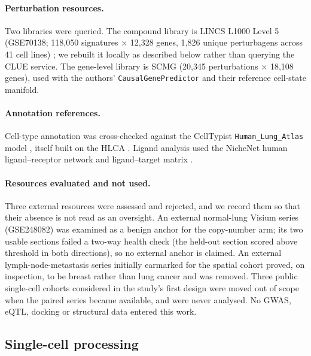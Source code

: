 \paragraph{Perturbation resources.} Two libraries were queried. The compound library is
LINCS L1000 Level 5 (GSE70138; 118{,}050 signatures $\times$ 12{,}328 genes, 1{,}826
unique perturbagens across 41 cell lines) \citep{subramanian2017}; we rebuilt it locally
as described below rather than querying the CLUE service. The gene-level library is SCMG
\citep{pan2026scmg} (20{,}345 perturbations $\times$ 18{,}108 genes), used with the
authors' \texttt{CausalGenePredictor} and their reference cell-state manifold.

\paragraph{Annotation references.} Cell-type annotation was cross-checked against the
CellTypist \texttt{Human\_Lung\_Atlas} model \citep{dominguezconde2022celltypist}, itself
built on the HLCA \citep{sikkema2023}. Ligand analysis used the NicheNet human
ligand--receptor network and ligand--target matrix \citep{browaeys2020nichenet}.

\paragraph{Resources evaluated and not used.} Three external resources were assessed and
rejected, and we record them so that their absence is not read as an oversight. An external
normal-lung Visium series (GSE248082) was examined as a benign anchor for the copy-number
arm; its two usable sections failed a two-way health check (the held-out section scored
above threshold in both directions), so no external anchor is claimed. An external
lymph-node-metastasis series initially earmarked for the spatial cohort proved, on
inspection, to be breast rather than lung cancer and was removed. Three public single-cell
cohorts considered in the study's first design were moved out of scope when the paired
series became available, and were never analysed. No GWAS, eQTL, docking or structural data
entered this work.





\subsection{Single-cell processing}

